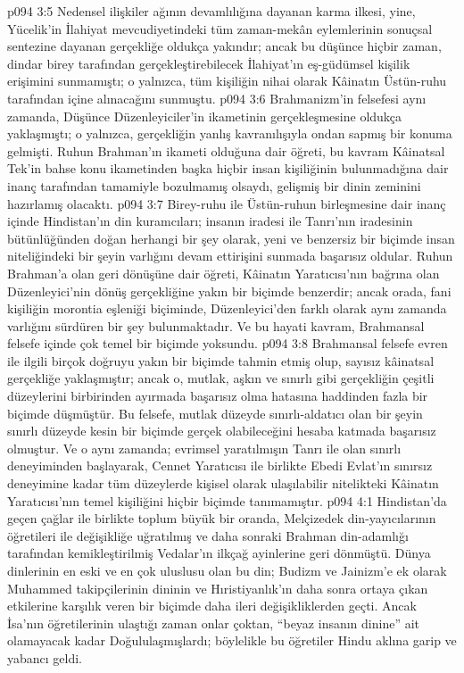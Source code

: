 \vs p094 3:5 Nedensel ilişkiler ağının devamlılığına dayanan karma ilkesi, yine, Yücelik’in İlahiyat mevcudiyetindeki tüm zaman\hyp{}mekân eylemlerinin sonuçsal sentezine dayanan gerçekliğe oldukça yakındır; ancak bu düşünce hiçbir zaman, dindar birey tarafından gerçekleştirebilecek İlahiyat’ın eş\hyp{}güdümsel kişilik erişimini sunmamıştı; o yalnızca, tüm kişiliğin nihai olarak Kâinatın Üstün\hyp{}ruhu tarafından içine alınacağını sunmuştu.
\vs p094 3:6 Brahmanizm’in felsefesi aynı zamanda, Düşünce Düzenleyiciler’in ikametinin gerçekleşmesine oldukça yaklaşmıştı; o yalnızca, gerçekliğin yanlış kavranılışıyla ondan sapmış bir konuma gelmişti. Ruhun Brahman’ın ikameti olduğuna dair öğreti, bu kavram Kâinatsal Tek’in bahse konu ikametinden başka hiçbir insan kişiliğinin bulunmadığına dair inanç tarafından tamamiyle bozulmamış olsaydı, gelişmiş bir dinin zeminini hazırlamış olacaktı.
\vs p094 3:7 Birey\hyp{}ruhu ile Üstün\hyp{}ruhun birleşmesine dair inanç içinde Hindistan’ın din kuramcıları; insanın iradesi ile Tanrı’nın iradesinin bütünlüğünden doğan herhangi bir şey olarak, yeni ve benzersiz bir biçimde insan niteliğindeki bir şeyin varlığını devam ettirişini sunmada başarısız oldular. Ruhun Brahman’a olan geri dönüşüne dair öğreti, Kâinatın Yaratıcısı’nın bağrına olan Düzenleyici’nin dönüş gerçekliğine yakın bir biçimde benzerdir; ancak orada, fani kişiliğin morontia eşleniği biçiminde, Düzenleyici’den farklı olarak aynı zamanda varlığını sürdüren bir şey bulunmaktadır. Ve bu hayati kavram, Brahmansal felsefe içinde çok temel bir biçimde yoksundu.
\vs p094 3:8 Brahmansal felsefe evren ile ilgili birçok doğruyu yakın bir biçimde tahmin etmiş olup, sayısız kâinatsal gerçekliğe yaklaşmıştır; ancak o, mutlak, aşkın ve sınırlı gibi gerçekliğin çeşitli düzeylerini birbirinden ayırmada başarısız olma hatasına haddinden fazla bir biçimde düşmüştür. Bu felsefe, mutlak düzeyde sınırlı\hyp{}aldatıcı olan bir şeyin sınırlı düzeyde kesin bir biçimde gerçek olabileceğini hesaba katmada başarısız olmuştur. Ve o aynı zamanda; evrimsel yaratılmışın Tanrı ile olan sınırlı deneyiminden başlayarak, Cennet Yaratıcısı ile birlikte Ebedi Evlat’ın sınırsız deneyimine kadar tüm düzeylerde kişisel olarak ulaşılabilir nitelikteki Kâinatın Yaratıcısı’nın temel kişiliğini hiçbir biçimde tanımamıştır.
\vs p094 4:1 Hindistan’da geçen çağlar ile birlikte toplum büyük bir oranda, Melçizedek din\hyp{}yayıcılarının öğretileri ile değişikliğe uğratılmış ve daha sonraki Brahman din\hyp{}adamlığı tarafından kemikleştirilmiş Vedalar’ın ilkçağ ayinlerine geri dönmüştü. Dünya dinlerinin en eski ve en çok uluslusu olan bu din; Budizm ve Jainizm’e ek olarak Muhammed takipçilerinin dininin ve Hıristiyanlık’ın daha sonra ortaya çıkan etkilerine karşılık veren bir biçimde daha ileri değişikliklerden geçti. Ancak İsa’nın öğretilerinin ulaştığı zaman onlar çoktan, “beyaz insanın dinine” ait olamayacak kadar Doğululaşmışlardı; böylelikle bu öğretiler Hindu aklına garip ve yabancı geldi.
